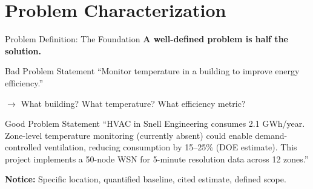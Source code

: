 \documentclass[aspectratio=169,11pt]{beamer}
\begin{document}
\section{Problem Characterization}

\begin{frame}{Problem Definition: The Foundation}
    \textbf{A well-defined problem is half the solution.}
    
    \vspace{0.3cm}
    \begin{alertblock}{Bad Problem Statement}
        ``Monitor temperature in a building to improve energy efficiency.''
        
        $\rightarrow$ What building? What temperature? What efficiency metric?
    \end{alertblock}
    
    \vspace{0.3cm}
    \begin{exampleblock}{Good Problem Statement}
        ``HVAC in Snell Engineering consumes 2.1 GWh/year. Zone-level temperature monitoring (currently absent) could enable demand-controlled ventilation, reducing consumption by 15--25\% (DOE estimate). This project implements a 50-node WSN for 5-minute resolution data across 12 zones.''
    \end{exampleblock}
    
    \vspace{0.2cm}
    \textbf{Notice:} Specific location, quantified baseline, cited estimate, defined scope.
\end{frame}
\end{document}

